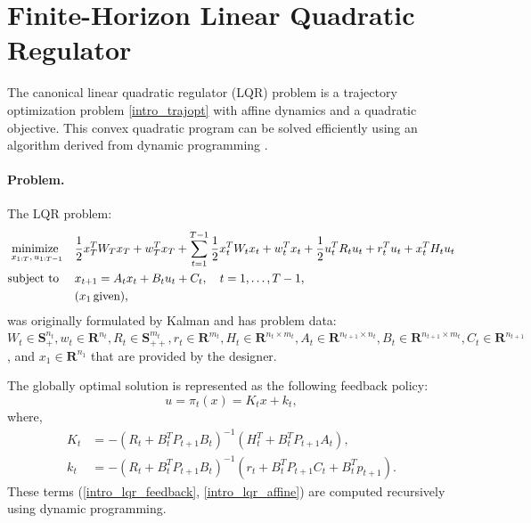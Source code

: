 \section{Finite-Horizon Linear Quadratic Regulator}
The canonical linear quadratic regulator (LQR) problem is a trajectory optimization problem \eqref{intro_trajopt} with affine dynamics and a quadratic objective. This convex quadratic program \cite{boyd2004convex} can be solved efficiently using an algorithm derived from dynamic programming \cite{bellman1966dynamic}.

\paragraph{Problem.}
The LQR problem:
\begin{align}
	\label{intro_lqr_problem}
	\underset{x_{1:T}, \phantom{\,} u_{1:T-1}}{\text{minimize }} & \quad  \frac{1}{2} x_T^T W_T x_T + w_T^T x_T + \sum \limits_{t = 1}^{T-1} \frac{1}{2} x_t^T W_t x_t + w_t^T x_t + \frac{1}{2} u_t^T R_t u_t + r_t^T u_t + x_t^T H_t u_t \\
	\text{subject to } & \quad x_{t+1} = A_t x_t + B_t u_t + C_t, \quad t = 1,\dots,T-1, \notag \\
	& \quad (x_1 \, \text{given}), \notag 
\end{align}
was originally formulated by Kalman \cite{kalman1964lqr} and has problem data: $W_t \in \mathbf{S}_{+}^{n_t}, w_t \in \mathbf{R}^{n_t}, R_t \in \mathbf{S}_{++}^{m_t}, r_t \in \mathbf{R}^{m_t}, H_t \in \mathbf{R}^{n_t \times m_t}, A_t \in \mathbf{R}^{n_{t+1} \times n_t}, B_t \in \mathbf{R}^{n_{t+1} \times m_t}, C_t \in \mathbf{R}^{n_{t+1}}$, and $x_1 \in \mathbf{R}^{n_1}$ that are provided by the designer.

The globally optimal solution is represented as the following feedback policy: 
\begin{equation}
	u = \pi_t(x) = K_t x + k_t, \label{intro_lqr_policy}
\end{equation}
where,
\begin{align}
	K_t &= -(R_t + B_t^T P_{t+1} B_t)^{-1} (H_t^T + B_t^T P_{t+1} A_t), \label{intro_lqr_feedback} \\
	k_t &= -(R_t + B_t^T P_{t+1} B_t)^{-1} (r_t + B_t^T P_{t+1} C_t + B_t^T p_{t+1}). \label{intro_lqr_affine}
\end{align}
These terms (\ref{intro_lqr_feedback}, \ref{intro_lqr_affine}) are computed recursively using dynamic programming.

